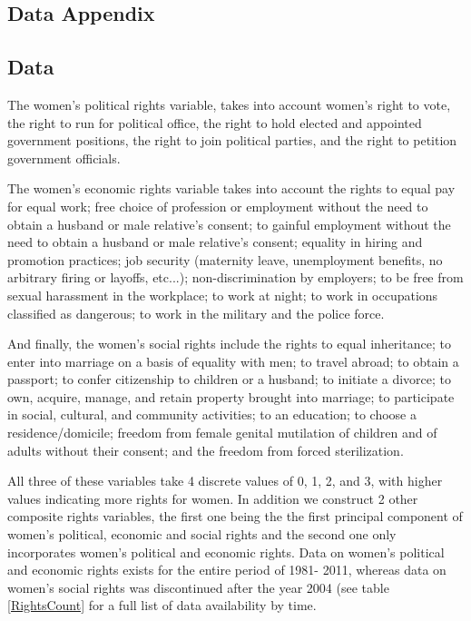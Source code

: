 \documentclass[11pt]{article}
\begin{document}
\begin{spacing}{1.4}
\newpage
\appendix
\section{Data Appendix}
\label{app:Data}
\subsection{\citet{CingranelliData2013} Data}
The women's political rights variable, takes into account women's right to vote, 
the right to run for political office, the right to hold elected and appointed 
government positions, the right to join political parties, and the right to petition 
government officials. 

The women's economic rights variable takes into account the rights to equal pay 
for equal work; free choice of profession or employment without the need to obtain 
a husband or male relative's consent; to gainful employment without the need to 
obtain a husband or male relative's consent; equality in hiring and promotion 
practices; job security (maternity leave, unemployment benefits, no arbitrary 
firing or layoffs, etc...); non-discrimination by employers; to be free from 
sexual harassment in the workplace; to work at night; to work in occupations 
classified as dangerous; to work in the military and the police force.  

And finally, the women's social rights include the rights to equal inheritance; 
to enter into marriage on a basis of equality with men; to travel abroad; to 
obtain a passport; to confer citizenship to children or a husband; to initiate a 
divorce; to own, acquire, manage, and retain property brought into marriage; to 
participate in social, cultural, and community activities; to an education; to 
choose a residence/domicile; freedom from female genital mutilation of children 
and of adults without their consent; and the freedom from forced sterilization.

All three of these variables take 4 discrete values of 0, 1, 2, and 3, with 
higher values indicating more rights for women. In addition we construct 2 other 
composite rights variables, the first one being the the first principal component 
of women's political, economic  and social rights and the second one only 
incorporates women's political and economic rights. Data on women's political 
and economic rights exists for the entire period of 1981- 2011, whereas data on 
women's social rights was discontinued after the year 2004 (see table 
\ref{RightsCount} for a full list of data availability by time.


\end{spacing}
\end{document}
